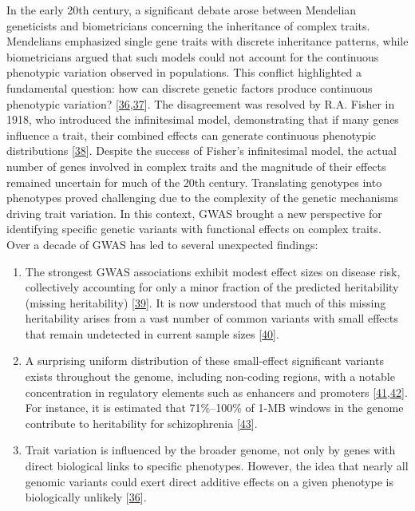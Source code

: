 In the early 20th century, a significant debate arose between Mendelian geneticists and biometricians concerning the inheritance of complex traits.
Mendelians emphasized single gene traits with discrete inheritance patterns, while biometricians argued that such models could not account for the continuous phenotypic variation observed in populations.
This conflict highlighted a fundamental question: how can discrete genetic factors produce continuous phenotypic variation? {[}\protect\hyperlink{ref-vpIDZCSa}{36},\protect\hyperlink{ref-15ldVppuv}{37}{]}.
The disagreement was resolved by R.A. Fisher in 1918, who introduced the infinitesimal model, demonstrating that if many genes influence a trait, their combined effects can generate continuous phenotypic distributions {[}\protect\hyperlink{ref-Qxk70FFV}{38}{]}.
Despite the success of Fisher's infinitesimal model, the actual number of genes involved in complex traits and the magnitude of their effects remained uncertain for much of the 20th century.
Translating genotypes into phenotypes proved challenging due to the complexity of the genetic mechanisms driving trait variation.
In this context, GWAS brought a new perspective for identifying specific genetic variants with functional effects on complex traits.
Over a decade of GWAS has led to several unexpected findings:

\begin{enumerate}
\def\labelenumi{\arabic{enumi}.}
\item
  The strongest GWAS associations exhibit modest effect sizes on disease risk, collectively accounting for only a minor fraction of the predicted heritability (missing heritability) {[}\protect\hyperlink{ref-RASeYPIy}{39}{]}.
  It is now understood that much of this missing heritability arises from a vast number of common variants with small effects that remain undetected in current sample sizes {[}\protect\hyperlink{ref-1AOy1zxAv}{40}{]}.
\item
  A surprising uniform distribution of these small-effect significant variants exists throughout the genome, including non-coding regions, with a notable concentration in regulatory elements such as enhancers and promoters {[}\protect\hyperlink{ref-mwTa2RUK}{41},\protect\hyperlink{ref-lVJVFaaZ}{42}{]}.
  For instance, it is estimated that 71\%--100\% of 1-MB windows in the genome contribute to heritability for schizophrenia {[}\protect\hyperlink{ref-XvQe1H3A}{43}{]}.
\item
  Trait variation is influenced by the broader genome, not only by genes with direct biological links to specific phenotypes.
  However, the idea that nearly all genomic variants could exert direct additive effects on a given phenotype is biologically unlikely {[}\protect\hyperlink{ref-vpIDZCSa}{36}{]}.
\end{enumerate}

